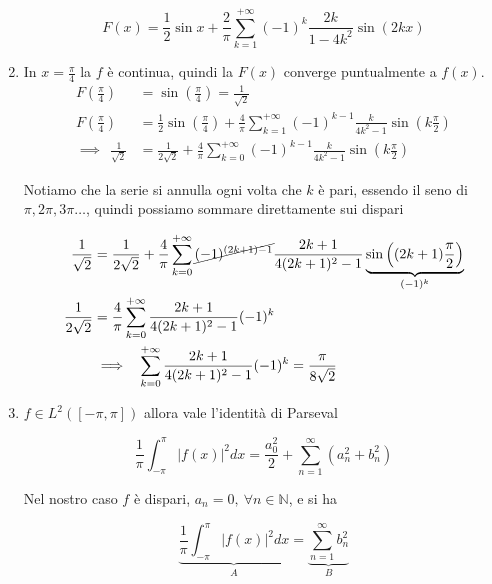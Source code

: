 \begin{enumerate}
\begin{equation*}
F( x) =\frac{1}{2}\sin x+\frac{2}{\pi }\sum ^{+\infty }_{k=1}( -1)^{k}\frac{2k}{1-4k^{2}}\sin( 2kx)
\end{equation*}
\item In $x=\frac{\pi }{4}$ la $f$ è continua, quindi la $F( x)$ converge puntualmente a $f( x)$.\begin{align*}
F\left(\frac{\pi }{4}\right) & =\sin\left(\frac{\pi }{4}\right) =\frac{1}{\sqrt{2}}\\
F\left(\frac{\pi }{4}\right) & =\frac{1}{2}\sin\left(\frac{\pi }{4}\right) +\frac{4}{\pi }\sum ^{+\infty }_{k=1}( -1)^{k-1}\frac{k}{4k^{2} -1}\sin\left( k\frac{\pi }{2}\right)\\
\implies \ \ \frac{1}{\sqrt{2}} & =\frac{1}{2\sqrt{2}} +\frac{4}{\pi }\sum ^{+\infty }_{k=0}( -1)^{k-1}\frac{k}{4k^{2} -1}\sin\left( k\frac{\pi }{2}\right)
\end{align*}

Notiamo che la serie si annulla ogni volta che $k$ è pari, essendo il seno di $\pi ,2\pi ,3\pi \dotsc $, quindi possiamo sommare direttamente sui dispari

\begin{equation*}
\begin{aligned}
\frac{1}{\sqrt{2}} & =\frac{1}{2\sqrt{2}} +\frac{4}{\pi }\sum ^{+\infty }_{k=0}\cancel{( -1)^{( 2k+1) -1}}\frac{2k+1}{4( 2k+1)^{2} -1}\underbrace{\sin\left(( 2k+1)\frac{\pi }{2}\right)}_{( -1)^{k}}\\
\frac{1}{2\sqrt{2}} & =\frac{4}{\pi }\sum ^{+\infty }_{k=0}\frac{2k+1}{4( 2k+1)^{2} -1}( -1)^{k}\\
 & \implies \ \ \sum ^{+\infty }_{k=0}\frac{2k+1}{4( 2k+1)^{2} -1}( -1)^{k} =\frac{\pi }{8\sqrt{2}}
\end{aligned}
\end{equation*}
\item $f\in L^{2}([ -\pi ,\pi ])$ allora vale l'identità di Parseval

\begin{equation*}
\frac{1}{\pi }\int ^{\pi }_{-\pi }| f( x)| ^{2} dx=\frac{a^{2}_{0}}{2} +\sum\limits ^{\infty }_{n=1}\left( a^{2}_{n} +b^{2}_{n}\right)
\end{equation*}

Nel nostro caso $f$ è dispari, $a_{n} =0,\ \forall n\in \mathbb{N}$, e si ha

\begin{equation*}
\underbrace{\frac{1}{\pi }\int ^{\pi }_{-\pi }| f( x)| ^{2} dx}_{A} =\underbrace{\sum\limits ^{\infty }_{n=1} b^{2}_{n}}_{B}
\end{equation*}


\end{enumerate}

